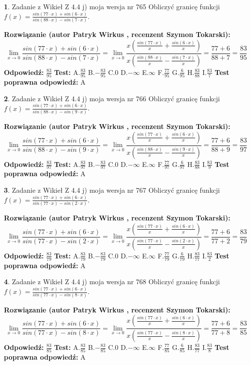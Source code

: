 \documentclass[12pt, a4paper]{article}
\theoremstyle{definition} %
\newtheorem{zad}{}
\newcommand{\zadStart}[1]{\begin{zad}#1\newline}
\newcommand{\zadStop}{\end{zad}}
\newcommand{\rozwStart}[2]{\noindent \textbf{Rozwiązanie (autor #1 , recenzent #2): }\newline}
\newcommand{\rozwStop}{\newline}
\newcommand{\odpStart}{\noindent \textbf{Odpowiedź:}\newline}
\newcommand{\odpStop}{\newline}
\newcommand{\testStart}{\noindent \textbf{Test:}\newline}
\newcommand{\testStop}{\newline}
\newcommand{\kluczStart}{\noindent \textbf{Test poprawna odpowiedź:}\newline}
\newcommand{\kluczStop}{\newline}
\begin{document}
\zadStart{Zadanie z Wikieł Z 4.4 j) moja wersja nr 765}
Obliczyć granicę funkcji $f(x)=\frac{sin(77\cdot x) +sin(6\cdot x)}{sin(88\cdot x) -sin(7\cdot x)}$.
\zadStop
\rozwStart{Patryk Wirkus}{Szymon Tokarski}
$$\lim\limits_{x\to 0}\frac{sin(77\cdot x) +sin(6\cdot x)}{sin(88\cdot x) -sin(7\cdot x)}=\lim\limits_{x\to 0}\frac{x(\frac{sin(77\cdot x)}{x}+\frac{sin(6\cdot x)}{x})}{x(\frac{sin(88\cdot x)}{x}-\frac{sin(7\cdot x)}{x})}=\frac{77+6}{88+7} = \frac{83}{95}$$
\rozwStop
\odpStart
$\frac{83}{95}$
\odpStop
\testStart
A.$\frac{83}{95}$
B.$-\frac{83}{95}$
C.$0$
D.$-\infty$
E.$\infty$
F.$\frac{77}{95}$
G.$\frac{6}{95}$
H.$\frac{83}{88}$
I.$\frac{83}{7}$
\testStop
\kluczStart
A
\kluczStop



\zadStart{Zadanie z Wikieł Z 4.4 j) moja wersja nr 766}
Obliczyć granicę funkcji $f(x)=\frac{sin(77\cdot x) +sin(6\cdot x)}{sin(88\cdot x) -sin(9\cdot x)}$.
\zadStop
\rozwStart{Patryk Wirkus}{Szymon Tokarski}
$$\lim\limits_{x\to 0}\frac{sin(77\cdot x) +sin(6\cdot x)}{sin(88\cdot x) -sin(9\cdot x)}=\lim\limits_{x\to 0}\frac{x(\frac{sin(77\cdot x)}{x}+\frac{sin(6\cdot x)}{x})}{x(\frac{sin(88\cdot x)}{x}-\frac{sin(9\cdot x)}{x})}=\frac{77+6}{88+9} = \frac{83}{97}$$
\rozwStop
\odpStart
$\frac{83}{97}$
\odpStop
\testStart
A.$\frac{83}{97}$
B.$-\frac{83}{97}$
C.$0$
D.$-\infty$
E.$\infty$
F.$\frac{77}{97}$
G.$\frac{6}{97}$
H.$\frac{83}{88}$
I.$\frac{83}{9}$
\testStop
\kluczStart
A
\kluczStop



\zadStart{Zadanie z Wikieł Z 4.4 j) moja wersja nr 767}
Obliczyć granicę funkcji $f(x)=\frac{sin(77\cdot x) +sin(6\cdot x)}{sin(77\cdot x) -sin(2\cdot x)}$.
\zadStop
\rozwStart{Patryk Wirkus}{Szymon Tokarski}
$$\lim\limits_{x\to 0}\frac{sin(77\cdot x) +sin(6\cdot x)}{sin(77\cdot x) -sin(2\cdot x)}=\lim\limits_{x\to 0}\frac{x(\frac{sin(77\cdot x)}{x}+\frac{sin(6\cdot x)}{x})}{x(\frac{sin(77\cdot x)}{x}-\frac{sin(2\cdot x)}{x})}=\frac{77+6}{77+2} = \frac{83}{79}$$
\rozwStop
\odpStart
$\frac{83}{79}$
\odpStop
\testStart
A.$\frac{83}{79}$
B.$-\frac{83}{79}$
C.$0$
D.$-\infty$
E.$\infty$
F.$\frac{77}{79}$
G.$\frac{6}{79}$
H.$\frac{83}{77}$
I.$\frac{83}{2}$
\testStop
\kluczStart
A
\kluczStop



\zadStart{Zadanie z Wikieł Z 4.4 j) moja wersja nr 768}
Obliczyć granicę funkcji $f(x)=\frac{sin(77\cdot x) +sin(6\cdot x)}{sin(77\cdot x) -sin(8\cdot x)}$.
\zadStop
\rozwStart{Patryk Wirkus}{Szymon Tokarski}
$$\lim\limits_{x\to 0}\frac{sin(77\cdot x) +sin(6\cdot x)}{sin(77\cdot x) -sin(8\cdot x)}=\lim\limits_{x\to 0}\frac{x(\frac{sin(77\cdot x)}{x}+\frac{sin(6\cdot x)}{x})}{x(\frac{sin(77\cdot x)}{x}-\frac{sin(8\cdot x)}{x})}=\frac{77+6}{77+8} = \frac{83}{85}$$
\rozwStop
\odpStart
$\frac{83}{85}$
\odpStop
\testStart
A.$\frac{83}{85}$
B.$-\frac{83}{85}$
C.$0$
D.$-\infty$
E.$\infty$
F.$\frac{77}{85}$
G.$\frac{6}{85}$
H.$\frac{83}{77}$
I.$\frac{83}{8}$
\testStop
\kluczStart
A
\kluczStop
\end{document}
